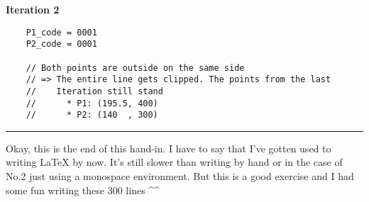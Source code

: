 \textbf{Iteration 2}

\begin{verbatim}
    P1_code = 0001
    P2_code = 0001

    // Both points are outside on the same side
    // => The entire line gets clipped. The points from the last
    //    Iteration still stand
    //      * P1: (195.5, 400)
    //      * P2: (140  , 300)

\end{verbatim}

\rule{\textwidth}{0.25mm}
Okay, this is the end of this hand-in. I have to say that I've gotten used to writing \LaTeX{} by now. It's still slower than writing by hand or in the case of No.2 just using a monospace environment. But this is a good exercise and I had some fun writing these 300 lines \string^\string^